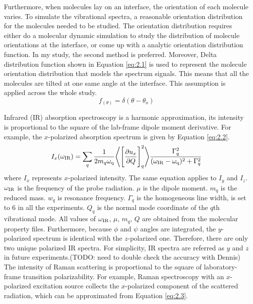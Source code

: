 Furthermore, when molecules lay on an interface, the orientation of each molecule varies. To simulate the vibrational spectra, a reasonable orientation distribution for the molecules needed to be studied. The orientation distribution requires either do a molecular dynamic simulation to study the distribution of molecule orientations at the interface, or come up with a analytic orientation distribution function. In my study, the second method is preferred. Moreover, Delta distribution function shown in Equation \ref{eq:2.1} is used to represent the molecule orientation distribution that models the spectrum signals. This means that all the molecules are tilted at one same angle at the interface. This assumption is applied across the whole study. \\
\begin{equation} \label{eq:2.1}
f_{(\theta)} = \delta(\theta - \theta_{o})
\end{equation} 

Infrared (IR) absorption spectroscopy is a harmonic approximation, its intensity is proportional to the square of the lab-frame dipole moment derivative. For example, the $x$-polarized absorption spectrum is given by Equation \ref{eq:2.2}. \\

\begin{equation} \label{eq:2.2}
I_x(\omega_{\rm IR}) = \sum_{q} \frac{1}{2 m_{q} \omega_{\rm q}} \Bigg \langle \Bigg\lbrack \frac{\partial u_x}{\partial Q} \Bigg\rbrack_{q} ^2 \Bigg\rangle \frac{\Gamma_q^2}{(\omega_{\rm IR}-\omega_{\rm q})^2 + \Gamma_q^2}
\end{equation} 
where $I_x$ represents $x$-polarized intensity. The same equation applies to $I_y$ and $I_z$. $\omega_{\rm IR}$ is the frequency of the probe radiation. $\mu$ is the dipole moment. $m_q$ is the reduced mass. $w_q$ is resonance frequency. $\Gamma_q$ is the homogeneous line width, is set to 6 in all the experiments. $Q_q$ is the normal mode coordinate of the $q$th vibrational mode. All values of $\omega_{\rm IR}$, $\mu$, $m_q$, $Q$ are obtained from the molecular property files. Furthermore, because $\phi$ and $\psi$ angles are integrated, the $y$-polarized spectrum is identical with the $z$-polarized one. Therefore, there are only two unique polarized IR spectra. For simplicity, IR spectra are referred as $y$ and $z$ in future experiments.(TODO: need to double check the accuracy with Dennis) \\

The intensity of Raman scattering is proportional to the square of laboratory-frame transition polarizability. For example, Raman spectroscopy with an $x$-polarized excitation source collects the $x$-polarized component of the scattered radiation, which can be approximated from Equation \ref{eq:2.3}. \\

